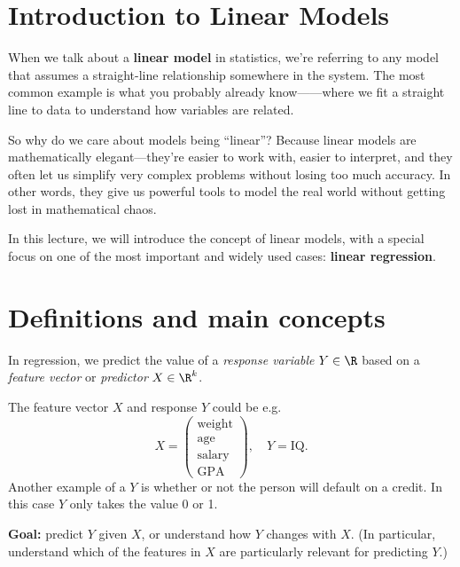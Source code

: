 \documentclass[11pt]{article}
\begin{document}



\section{Introduction to Linear Models}

When we talk about a \textbf{linear model} in statistics, we’re referring to any model that assumes a straight-line relationship somewhere in the system. The most common example is what you probably already know——where we fit a straight line to data to understand how variables are related.


So why do we care about models being ``linear''? Because linear models are mathematically elegant—they’re easier to work with, easier to interpret, and they often let us simplify very complex problems without losing too much accuracy. In other words, they give us powerful tools to model the real world without getting lost in mathematical chaos.

\vspace{1em}

In this lecture, we will introduce the concept of linear models, with a special focus on one of the most important and widely used cases: \textbf{linear regression}.

\section{Definitions and main concepts}
In regression, we predict the value of a \emph{response variable} $Y\in\R$ based on a \emph{feature vector} or \emph{predictor} $X\in\R^k$.
\begin{example}
The feature vector $X$ and response $Y$ could be e.g.
$$X=
\begin{pmatrix}\text{weight}\\\text{age}\\ \text{salary}\\\text{GPA}\end{pmatrix},\quad Y=\text{IQ}.
$$
Another example of a $Y$ is whether or not the person will default on a credit. In this case $Y$ only takes the value 0 or 1.
\end{example}


\noindent \textbf{Goal:} predict $Y$ given $X$, or understand how $Y$ changes with $X$. (In particular, understand which of the features in $X$ are particularly relevant for predicting $Y$.)\\
\end{document}
